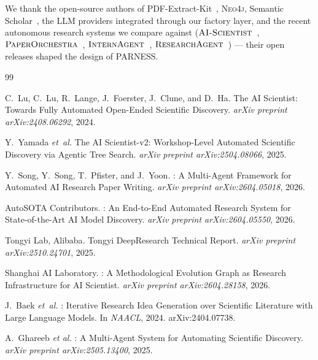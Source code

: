 \documentclass{article}
\newcommand{\parness}{\textsf{PARNESS}}
\begin{document}
We thank the open-source authors of PDF-Extract-Kit~\cite{pdfextractkit},
\textsc{Neo4j}, Semantic Scholar~\cite{s2ag,s2ods}, the LLM providers
integrated through our factory layer, and the recent autonomous research
systems we compare against ($\textsc{AI-Scientist}$~\cite{aisciv1,aisciv2},
$\textsc{PaperOrchestra}$~\cite{paperorchestra},
$\textsc{InternAgent}$~\cite{internagent},
$\textsc{ResearchAgent}$~\cite{researchagent}) --- their open releases
shaped the design of \parness{}.

\begin{thebibliography}{99}

C.~Lu, C.~Lu, R.~Lange, J.~Foerster, J.~Clune, and D.~Ha.
\newblock The {AI} Scientist: Towards Fully Automated Open-Ended Scientific Discovery.
\newblock \emph{arXiv preprint arXiv:2408.06292}, 2024.

Y.~Yamada \emph{et~al.}
\newblock The {AI} Scientist-v2: Workshop-Level Automated Scientific Discovery via Agentic Tree Search.
\newblock \emph{arXiv preprint arXiv:2504.08066}, 2025.

Y.~Song, Y.~Song, T.~Pfister, and J.~Yoon.
: A Multi-Agent Framework for Automated {AI} Research Paper Writing.
\newblock \emph{arXiv preprint arXiv:2604.05018}, 2026.

{AutoSOTA Contributors}.
: An End-to-End Automated Research System for State-of-the-Art {AI} Model Discovery.
\newblock \emph{arXiv preprint arXiv:2604.05550}, 2026.

{Tongyi Lab, Alibaba}.
\newblock Tongyi {DeepResearch} Technical Report.
\newblock \emph{arXiv preprint arXiv:2510.24701}, 2025.

{Shanghai AI Laboratory}.
: A Methodological Evolution Graph as Research Infrastructure for {AI} Scientist.
\newblock \emph{arXiv preprint arXiv:2604.28158}, 2026.

J.~Baek \emph{et~al.}
: Iterative Research Idea Generation over Scientific Literature with Large Language Models.
\newblock In \emph{NAACL}, 2024.
\newblock arXiv:2404.07738.

{A.~Ghareeb \emph{et al.}}
: A Multi-Agent System for Automating Scientific Discovery.
\newblock \emph{arXiv preprint arXiv:2505.13400}, 2025.


\end{thebibliography}
\end{document}
